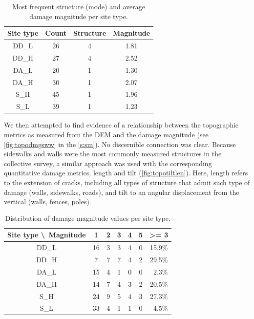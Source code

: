 \documentclass[final,12pt,times,twocolumn,authoryear]{elsarticle}
\begin{document}
\begin{table}[]
	\centering
	\caption{Most frequent structure (mode) and average damage magnitude per site type.}
	\label{t:strutmode}
	\begin{tabular}{@{}cccc@{}}
		\toprule
		Site type & Count & Structure & Magnitude \\ \midrule
		DD\_L     & 26    & 4              & 1.81           \\
		DD\_H     & 27    & 4              & 2.52           \\
		DA\_L     & 20    & 1              & 1.30           \\
		DA\_H     & 30    & 1              & 2.07           \\
		S\_H      & 45    & 1              & 1.96           \\
		S\_L      & 39    & 1              & 1.23           \\ \bottomrule
	\end{tabular}
\end{table}

We then attempted to find evidence of a relationship between the topographic metrics as measured from the DEM and the damage magnitude (see \autoref{fig:topodmgsww} in the \autoref{s:sm}). No discernible connection was clear. Because sidewalks and walls were the most commonly measured structures in the collective survey, a similar approach was used with the corresponding quantitative damage metrics, length and tilt (\autoref{fig:topotiltlen}). Here, length refers to the extension of cracks, including all types of structure that admit such type of damage (walls, sidewalks, roads), and tilt to an angular displacement from the vertical (walls, fences, poles).

\begin{table}[]
	\centering
	\caption{Distribution of damage magnitude values per site type.}
	\label{t:sitemag}
	\begin{tabular}{@{}ccccccc@{}}
		\toprule
		Site type \textbackslash\, Magnitude & 1  & 2 & 3 & 4 & 5 & \textgreater= 3 \\ \midrule
		DD\_L                              & 16 & 3 & 3 & 4 & 0 & 15.9\%          \\
		DD\_H                              & 7  & 7 & 7 & 4 & 2 & 29.5\%          \\
		DA\_L                              & 15 & 4 & 1 & 0 & 0 & \, 2.3\%           \\
		DA\_H                              & 14 & 7 & 4 & 3 & 2 & 20.5\%          \\
		S\_H                               & 24 & 9 & 5 & 4 & 3 & 27.3\%          \\
		S\_L                               & 33 & 4 & 1 & 1 & 0 & \, 4.5\%           \\ \bottomrule
	\end{tabular}
\end{table}
\end{document}
